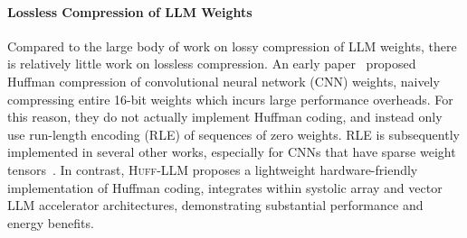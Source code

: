 



\paragraph{Lossless Compression of LLM Weights}
Compared to the large body of work on 
lossy compression of LLM weights, there is relatively little work on lossless compression. 
An early paper~\cite{han2015deep} proposed Huffman compression of 
convolutional neural network (CNN) weights, naively compressing entire 16-bit weights which incurs large performance overheads. For this reason, they do not actually implement Huffman coding, and instead only use 
run-length encoding (RLE) of sequences of zero weights. RLE is subsequently 
implemented in several other works, especially for CNNs that have sparse weight tensors~\cite{chen2016eyeriss}. %
In contrast, \textsc{Huff-LLM} proposes a lightweight 
hardware-friendly implementation of Huffman coding, 
integrates within 
systolic array and vector LLM accelerator architectures, demonstrating 
substantial performance and energy benefits. 

